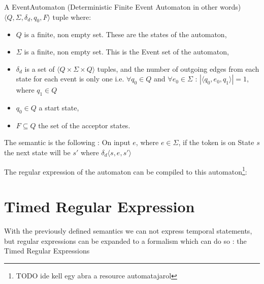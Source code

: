 			\begin{dfn}
				\label{dfn:cep:dfea}
				A EventAutomaton (Deterministic Finite Event Automaton in other words) $\langle Q,\Sigma,\delta_d,q_0, F \rangle$ tuple where: 
					\begin{itemize}
						\item $Q$ is a finite, non empty set. These are the states of the automaton,
						\item $\Sigma$ is a finite, non empty set. This is the Event set of the automaton,
						\item $\delta_d$ is a set of $\langle Q \times \Sigma \times Q \rangle$ tuples,
							and the number of outgoing edges from each state for each event is only one 
							i.e. $\forall q_0 \in Q$ and $\forall e_0 \in \Sigma$ : $|\langle q_0, e_0, q_1 \rangle| = 1$, where $q_1 \in Q$ 
						\item $q_0 \in Q$ a start state,
						\item $F \subseteq Q$ the set of the acceptor states.
					\end{itemize}	
			\end{dfn}

			The semantic is the following : 
			On input $e$, where $e \in \Sigma$, if the token is on State $s$ the next state will be $s'$ where %
			$\delta_d \langle s,e,s' \rangle$ 
			
			The regular expression of the automaton can be compiled to this automaton\footnote{TODO ide kell egy abra a resource automatajarol}:
			
			

		
	\section{Timed Regular Expression}
	
		With the previously defined semantics we can not express temporal statements,
		but regular expressions can be expanded to a formalism which can do so : 
		the Timed Regular Expressions
		

